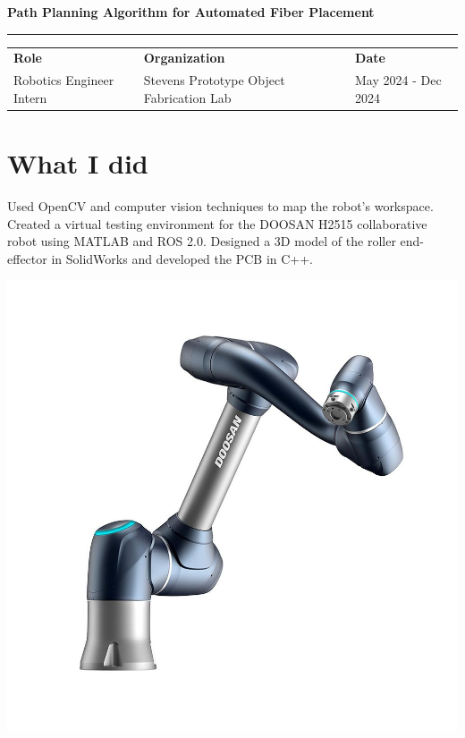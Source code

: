 \documentclass[a4paper]{article}
\begin{document}
\thispagestyle{empty}

\begin{center}
    {\Large \textbf{Path Planning Algorithm for Automated Fiber Placement}}\\[0.1em]
    \hfill
\end{center}


\vspace{1em}
\hrule
\vspace{1em}


\begin{tabularx}{\textwidth}{>{\centering\arraybackslash}X>{\centering\arraybackslash}X>{\centering\arraybackslash}X}
    \textbf{Role} & \textbf{Organization} & \textbf{Date} \\
    Robotics Engineer Intern & Stevens Prototype Object Fabrication Lab & May 2024 - Dec 2024 
\end{tabularx}

\section*{What I did}

\parbox[b]{.6\textwidth}{
    Used OpenCV and computer vision techniques to map the robot's workspace.
    Created a virtual testing environment for the DOOSAN H2515 collaborative robot using MATLAB and ROS 2.0.
    Designed a 3D model of the roller end-effector in SolidWorks and developed the PCB in C++.

}
\includegraphics[width=.4\textwidth]{images/doosan-logo.jpg}%


\noindent
\end{document}
